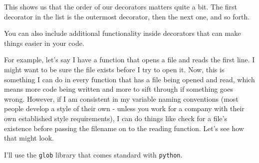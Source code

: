     This shows us that the order of our decorators matters quite a bit. The
first decorator in the list is the outermost decorator, then the next
one, and so forth.

You can also include additional functionality inside decorators that can
make things easier in your code.

For example, let's say I have a function that opens a file and reads the
first line. I might want to be sure the file exists before I try to open
it. Now, this is something I can do in every function that has a file
being opened and read, which means more code being written and more to
sift through if something goes wrong. However, if I am consistent in my
variable naming conventions (most people develop a style of their own -
unless you work for a company with their own established style
requirements), I can do things like check for a file's existence before
passing the filename on to the reading function. Let's see how that
might look.

I'll use the \texttt{glob} library that comes standard with
\texttt{python}.

